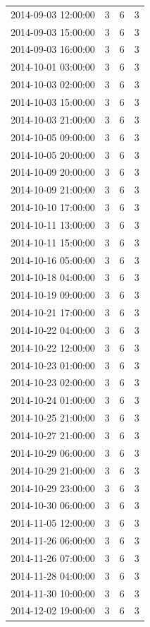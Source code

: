 \begin{tabular}{lrrr}
2014-09-03 12:00:00 & 3 & 6 & 3 \\
2014-09-03 15:00:00 & 3 & 6 & 3 \\
2014-09-03 16:00:00 & 3 & 6 & 3 \\
2014-10-01 03:00:00 & 3 & 6 & 3 \\
2014-10-03 02:00:00 & 3 & 6 & 3 \\
2014-10-03 15:00:00 & 3 & 6 & 3 \\
2014-10-03 21:00:00 & 3 & 6 & 3 \\
2014-10-05 09:00:00 & 3 & 6 & 3 \\
2014-10-05 20:00:00 & 3 & 6 & 3 \\
2014-10-09 20:00:00 & 3 & 6 & 3 \\
2014-10-09 21:00:00 & 3 & 6 & 3 \\
2014-10-10 17:00:00 & 3 & 6 & 3 \\
2014-10-11 13:00:00 & 3 & 6 & 3 \\
2014-10-11 15:00:00 & 3 & 6 & 3 \\
2014-10-16 05:00:00 & 3 & 6 & 3 \\
2014-10-18 04:00:00 & 3 & 6 & 3 \\
2014-10-19 09:00:00 & 3 & 6 & 3 \\
2014-10-21 17:00:00 & 3 & 6 & 3 \\
2014-10-22 04:00:00 & 3 & 6 & 3 \\
2014-10-22 12:00:00 & 3 & 6 & 3 \\
2014-10-23 01:00:00 & 3 & 6 & 3 \\
2014-10-23 02:00:00 & 3 & 6 & 3 \\
2014-10-24 01:00:00 & 3 & 6 & 3 \\
2014-10-25 21:00:00 & 3 & 6 & 3 \\
2014-10-27 21:00:00 & 3 & 6 & 3 \\
2014-10-29 06:00:00 & 3 & 6 & 3 \\
2014-10-29 21:00:00 & 3 & 6 & 3 \\
2014-10-29 23:00:00 & 3 & 6 & 3 \\
2014-10-30 06:00:00 & 3 & 6 & 3 \\
2014-11-05 12:00:00 & 3 & 6 & 3 \\
2014-11-26 06:00:00 & 3 & 6 & 3 \\
2014-11-26 07:00:00 & 3 & 6 & 3 \\
2014-11-28 04:00:00 & 3 & 6 & 3 \\
2014-11-30 10:00:00 & 3 & 6 & 3 \\
2014-12-02 19:00:00 & 3 & 6 & 3 \\

\end{tabular}

